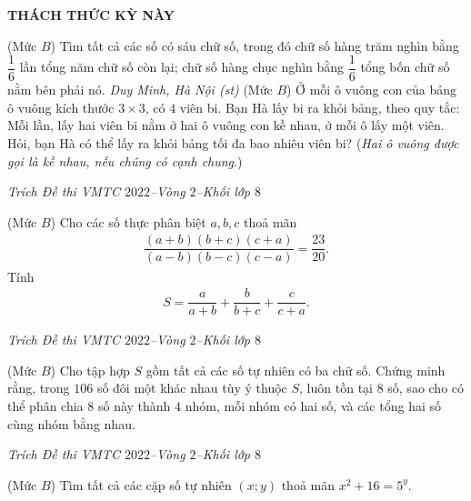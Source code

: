 \begin{center}
	\vspace*{-5pt}
	\textbf{\color{thachthuctoanhoc}\color{thachthuctoanhoc}\color{thachthuctoanhoc}THÁCH THỨC KỲ NÀY}
	\vspace*{-5pt}
\end{center}
\begin{multicols}{2}
	\setlength{\abovedisplayskip}{4pt}
	\setlength{\belowdisplayskip}{4pt}
	{}
	(Mức $B$) Tìm tất cả các số có sáu chữ số, trong đó chữ số hàng trăm nghìn bằng $\dfrac16$ lần tổng năm chữ số còn lại; chữ số hàng chục nghìn bằng $\dfrac16$  tổng bốn chữ số nằm bên phải nó.
	\vskip 0.05cm
	\hfill	\textit{\small Duy Minh, Hà Nội (st)}
	\vskip 0.05cm
	{}
	(Mức $B$)  Ở mỗi ô vuông con của bảng ô vuông kích thước $3\times3$, có $4$ viên bi. Bạn Hà lấy bi ra khỏi bảng, theo quy tắc: Mỗi lần, lấy hai viên bi nằm ở hai ô vuông con kề nhau, ở mỗi ô lấy một viên. Hỏi, bạn Hà có thể lấy ra khỏi bảng tối đa bao nhiêu viên bi?
	\vskip 0.05cm
	({\it Hai ô vuông được gọi là kề nhau, nếu chúng có cạnh chung}.)
	\begin{flushright}
		\textit{\small Trích Đề thi VMTC $2022$--Vòng $2$--Khối lớp $8$}
	\end{flushright}
	{\color{thachthuctoanhoc}{\usefont{T5}{qag}{b}{n} P693.}}
	(Mức $B$) Cho các số thực phân biệt $a,b,c$  thoả mãn
	\begin{align*}
		\dfrac{(a+b)(b+c)(c+a)}{(a-b)(b-c)(c-a)}=\dfrac{23}{20}.
	\end{align*}
	Tính
	\begin{align*}
		S=\dfrac{a}{a+b}+\dfrac{b}{b+c}+\dfrac{c}{c+a}.
	\end{align*}
	\begin{flushright}
		\textit{\small Trích Đề thi VMTC $2022$--Vòng $2$--Khối lớp $8$}
	\end{flushright}
	{\color{thachthuctoanhoc}{\usefont{T5}{qag}{b}{n} P694.}}
	(Mức $B$) Cho tập hợp $S$ gồm tất cả các số tự nhiên có ba chữ số. Chứng minh rằng, trong $106$ số đôi một khác nhau tùy ý thuộc $S$, luôn tồn tại $8$ số, sao cho có thể phân chia $8$ số này thành $4$ nhóm, mỗi nhóm có hai số, và các tổng hai số cùng nhóm bằng nhau.
	\begin{flushright}
		\textit{\small Trích Đề thi VMTC $2022$--Vòng $2$--Khối lớp $8$}
	\end{flushright}
	{}
	(Mức $B$) Tìm tất cả các cặp số tự nhiên $(x;y)$ thoả mãn $x^2+16=5^y$. 

\end{multicols}
